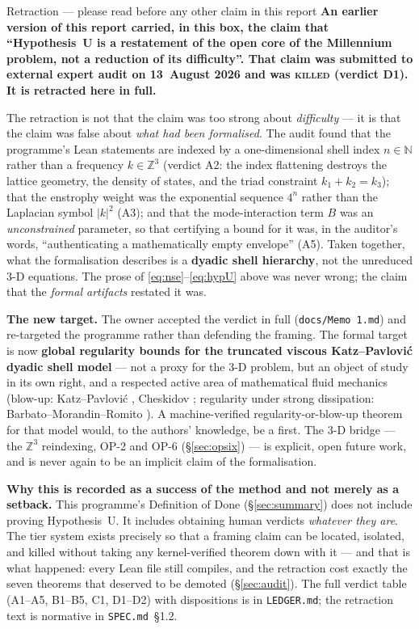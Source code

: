 \documentclass[11pt,a4paper]{article}
\newcommand{\Z}{\mathbb{Z}}
\newcommand{\N}{\mathbb{N}}
\theoremstyle{definition}
\theoremstyle{plain}
\begin{document}
\begin{warnbox}{Retraction --- please read before any other claim in this report}
\textbf{An earlier version of this report carried, in this box, the claim that
``Hypothesis~U is a restatement of the open core of the Millennium problem, not a reduction of
its difficulty''. That claim was submitted to external expert audit on 13~August 2026 and was
\textsc{killed} (verdict D1). It is retracted here in full.}

The retraction is not that the claim was too strong about \emph{difficulty} --- it is that the
claim was false about \emph{what had been formalised}. The audit found that the programme's
Lean statements are indexed by a one-dimensional shell index $n\in\N$ rather than a
frequency $k\in\Z^3$ (verdict A2: the index flattening destroys the lattice geometry, the
density of states, and the triad constraint $k_1+k_2=k_3$); that the enstrophy weight was the
exponential sequence $4^n$ rather than the Laplacian symbol $|k|^2$ (A3); and that the
mode-interaction term $B$ was an \emph{unconstrained} parameter, so that certifying a bound
for it was, in the auditor's words, ``authenticating a mathematically empty envelope'' (A5).
Taken together, what the formalisation describes is a \textbf{dyadic shell hierarchy}, not the
unreduced 3-D equations. The prose of \eqref{eq:nse}--\eqref{eq:hypU} above was never wrong;
the claim that the \emph{formal artifacts} restated it was.

\textbf{The new target.} The owner accepted the verdict in full (\texttt{docs/Memo 1.md}) and
re-targeted the programme rather than defending the framing. The formal target is now
\textbf{global regularity bounds for the truncated viscous Katz--Pavlovi\'c dyadic shell
model} --- not a proxy for the 3-D problem, but an object of study in its own right, and a
respected active area of mathematical fluid mechanics (blow-up: Katz--Pavlovi\'c
\cite{katz-pavlovic}, Cheskidov \cite{cheskidov}; regularity under strong dissipation:
Barbato--Morandin--Romito \cite{barbato-morandin-romito}). A machine-verified
regularity-or-blow-up theorem for that model would, to the authors' knowledge, be a first. The
3-D bridge --- the $\Z^3$ reindexing, OP-2 and OP-6 (\S\ref{sec:opsix}) --- is explicit, open
future work, and is never again to be an implicit claim of the formalisation.

\textbf{Why this is recorded as a success of the method and not merely as a setback.} This
programme's Definition of Done (\S\ref{sec:summary}) does not include proving Hypothesis~U. It
includes obtaining human verdicts \emph{whatever they are}. The tier system exists precisely so
that a framing claim can be located, isolated, and killed without taking any kernel-verified
theorem down with it --- and that is what happened: every Lean file still compiles, and the
retraction cost exactly the seven theorems that deserved to be demoted (\S\ref{sec:audit}).
The full verdict table (A1--A5, B1--B5, C1, D1--D2) with dispositions is in \texttt{LEDGER.md};
the retraction text is normative in \texttt{SPEC.md}~\S1.2.
\end{warnbox}
\end{document}
